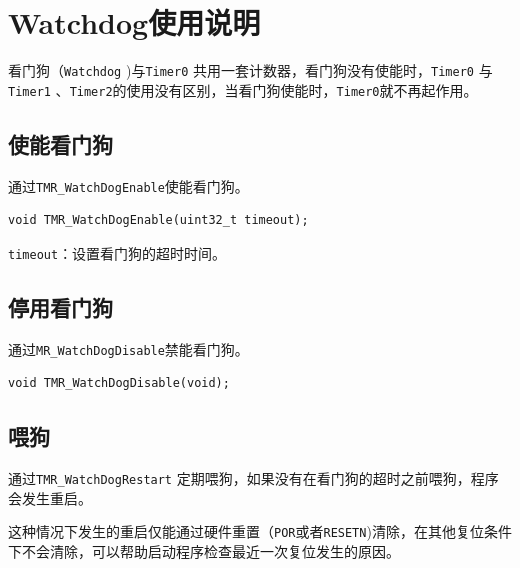 \documentclass[
  12pt,
]{book}
\begin{document}
\hypertarget{watchdogux4f7fux7528ux8bf4ux660e}{%
\section{Watchdog使用说明}\label{watchdogux4f7fux7528ux8bf4ux660e}}

看门狗（\texttt{Watchdog} )与\texttt{Timer0} 共用一套计数器，看门狗没有使能时，\texttt{Timer0} 与\texttt{Timer1} 、\texttt{Timer2}的使用没有区别，当看门狗使能时，\texttt{Timer0}就不再起作用。

\hypertarget{ux4f7fux80fdux770bux95e8ux72d7}{%
\subsection{使能看门狗}\label{ux4f7fux80fdux770bux95e8ux72d7}}

通过\texttt{TMR\_WatchDogEnable}使能看门狗。

\begin{verbatim}
void TMR_WatchDogEnable(uint32_t timeout);
\end{verbatim}

\texttt{timeout}：设置看门狗的超时时间。

\hypertarget{ux505cux7528ux770bux95e8ux72d7}{%
\subsection{停用看门狗}\label{ux505cux7528ux770bux95e8ux72d7}}

通过\texttt{MR\_WatchDogDisable}禁能看门狗。

\begin{verbatim}
void TMR_WatchDogDisable(void);
\end{verbatim}

\hypertarget{ux5582ux72d7}{%
\subsection{喂狗}\label{ux5582ux72d7}}

通过\texttt{TMR\_WatchDogRestart} 定期喂狗，如果没有在看门狗的超时之前喂狗，程序会发生重启。

这种情况下发生的重启仅能通过硬件重置（\texttt{POR}或者\texttt{RESETN})清除，在其他复位条件下不会清除，可以帮助启动程序检查最近一次复位发生的原因。

  

\backmatter
\printindex
\end{document}
